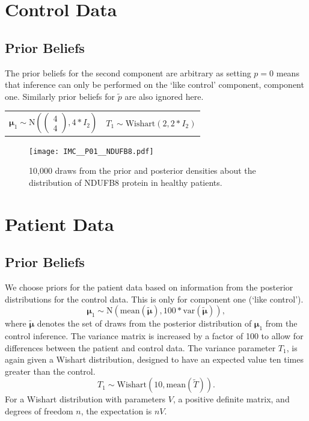 \documentclass[a4paper, 12pt]{article}
\begin{document}
\section*{Control Data}
\subsection*{Prior Beliefs}
The prior beliefs for the second component are arbitrary as setting $p=0$ means that inference can only be performed on the `like control' component, component one. Similarly prior beliefs for $\tilde{p}$ are also ignored here. 
\begin{center}
\begin{tabular}{c  c}
    $\boldsymbol{\mu}_1 \sim \text{N}\left(\begin{pmatrix}4\\4\end{pmatrix}, 4*I_2 \right)$ &  $T_1 \sim \text{Wishart}(2, 2*I_2)$ \\
\end{tabular}
\end{center}

\begin{figure}[H]
    \centering
    \texttt{[image: IMC\_\_P01\_\_NDUFB8.pdf]}
    \caption{10,000 draws from the prior and posterior densities about the distribution of NDUFB8 protein in healthy patients.}
    \label{fig:imc_control_ndufb8}
\end{figure}

\section*{Patient Data}
\subsection*{Prior Beliefs}
We choose priors for the patient data based on information from the posterior distributions for the control data. This is only for component one (`like control'). 
\begin{equation}
    \boldsymbol{\mu}_1 \sim \text{N}\left( \text{mean}(\tilde{\boldsymbol{\mu}}),  100*\text{var}(\tilde{\boldsymbol{\mu}})\right),
\end{equation}
where $\tilde{\boldsymbol{\mu}}$ denotes the set of draws from the posterior distribution of $\boldsymbol{\mu}_1$ from the control inference. The variance matrix is increased by a factor of 100 to allow for differences between the patient and control data. The variance parameter $T_1$, is again given a Wishart distribution, designed to have an expected value ten times greater than the control.
\begin{equation}
    T_1 \sim \text{Wishart}\left(10, \text{mean}(\tilde{T}) \right).
\end{equation}
For a Wishart distribution with parameters $V$, a positive definite matrix, and degrees of freedom $n$, the expectation is $nV$. \\
\end{document}
